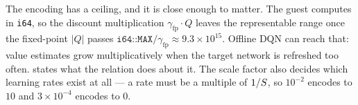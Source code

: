 The encoding has a ceiling, and it is close enough to matter. The guest
computes in \texttt{i64}, so the discount multiplication $\gamma_{\mathrm{fp}} \cdot Q$
leaves the representable range once the fixed-point $|Q|$ passes
$\texttt{i64::MAX} / \gamma_{\mathrm{fp}} \approx 9.3 \times 10^{15}$. Offline DQN can reach
that: value estimates grow multiplicatively when the target network is
refreshed too often.  states what the relation does about
it. The scale factor also decides which learning rates exist at all --- a rate
must be a multiple of $1/S$, so $10^{-2}$ encodes to $10$ and
$3 \times 10^{-4}$ encodes to $0$.
